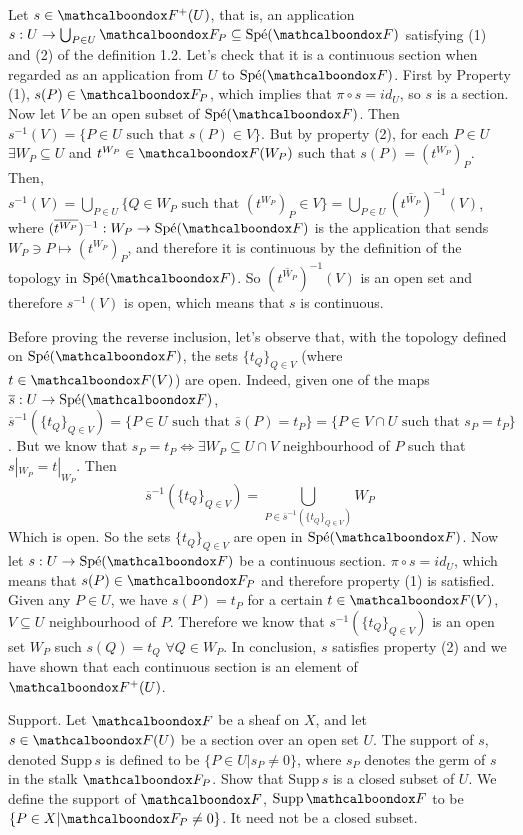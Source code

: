 \begin{sol}
	Let $s \in \sF^{+}(U)$, that is, an application $s: U \to \bigcup_{P \in U} \sF_P \subseteq \spe(\sF)$ satisfying (1) and (2) of the definition 1.2. Let's check that it is a continuous section when regarded as an application from $U$ to $\spe(\sF)$. First by Property (1), $s(P) \in \sF_P$, which implies that $\pi \circ s = id_U$, so $s$ is a section. Now let $V$ be an open subset of $\spe(\sF)$. Then $s^{-1}(V) = \{P \in U \text{ such that } s(P) \in V\}$. But by property (2), for each $P \in U$ $\exists W_P \subseteq U$ and $t^{W_P} \in \sF(W_P)$ such that $s(P) = (t^{W_P})_P$. Then, $s^{-1}(V) = \bigcup_{P \in U} \{Q \in W_P \text{ such that } (t^{W_P})_P \in V\}  = \bigcup_{P \in U} (\overline{t^{W_P}})^{-1}(V)$, where $(\overline{t^{W_P}})^{-1}: W_P \to \spe(\sF)$ is the application that sends $W_P \ni P \mapsto (t^{W_P})_P$, and therefore it is continuous by the definition of the topology in $\spe(\sF)$. So $(\overline{t^{W_P}})^{-1}(V)$ is an open set and therefore $s^{-1}(V)$ is open, which means that $s$ is continuous.

	Before proving the reverse inclusion, let's observe that, with the topology defined on $\spe(\sF)$, the sets $\{t_Q\}_{Q \in V}$ (where $t \in \sF(V)$) are open. Indeed, given one of the maps $\overline{s}: U \to \spe(\sF)$, $\overline{s}^{-1}(\{t_Q\}_{Q \in V}) = \{P \in U \text{ such that } \overline{s}(P) = t_P \} = \{P \in V \cap U \text{ such that } s_P = t_P\}$. But we know that $s_P = t_P \iff \exists W_P \subseteq U \cap V$ neighbourhood of $P$ such that $s|_{W_P} = t|_{W_P}$. Then
	\[
		\overline{s}^{-1}(\{t_Q\}_{Q \in V}) = \bigcup_{P \in \overline{s}^{-1}(\{t_Q\}_{Q \in V})} W_P
	\]
	Which is open. So the sets $\{t_Q\}_{Q \in V}$ are open in $\spe(\sF)$.	Now let $s: U \to \spe(\sF)$ be a continuous section. $\pi \circ s = id_U$, which means that $s(P) \in \sF_P$ and therefore property (1) is satisfied. Given any $P \in U$, we have $s(P) = t_P$ for a certain $t \in \sF(V)$, $V \subseteq U$ neighbourhood of $P$. Therefore we know that $s^{-1}(\{t_Q\}_{Q \in V})$ is an open set $W_P$ such $s(Q) = t_Q \, \, \forall Q \in W_P$. In conclusion, $s$ satisfies property (2) and we have shown that each continuous section is an element of $\sF^+(U)$.
\end{sol}

\begin{ex}
	Support. Let $\sF$ be a sheaf on $X$, and let $s \in \sF(U)$ be a section over an open set $U$. The support of $s$, denoted $\mathrm{Supp} \, s$ is defined to be $\{P \in U |s_P \neq 0\}$, where $s_P$ denotes the germ of $s$ in the stalk $\sF_P$. Show that $\mathrm{Supp} \, s$ is a closed subset of $U$. We define the support of $\sF$, $\mathrm{Supp} \, \sF$ to be $\{P \in X | \sF_P \neq 0\}$. It need not be a closed subset.
\end{ex}

